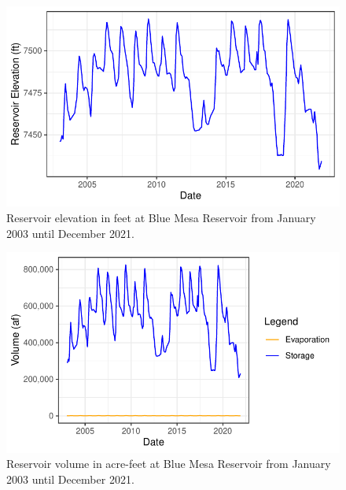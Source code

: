 \documentclass[
  12pt,
]{article}
\begin{document}
\begin{figure}

{\centering \includegraphics{Project_Report_files/figure-latex/elevation-1} 

}

\caption{Reservoir elevation in feet at Blue Mesa Reservoir from January 2003 until December 2021.}\label{fig:elevation}
\end{figure}

\begin{figure}

{\centering \includegraphics{Project_Report_files/figure-latex/volume-1} 

}

\caption{Reservoir volume in acre-feet at Blue Mesa Reservoir from January 2003 until December 2021.}\label{fig:volume}
\end{figure}
\end{document}
